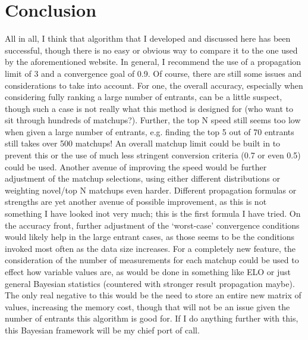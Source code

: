 \documentclass[11pt]{article}
\begin{document}
\section{Conclusion}
\noindent All in all, I think that algorithm that I developed and discussed here has been successful, though there is no easy or obvious way to compare it to the one used by the aforementioned website. In general, I recommend the use of a propagation limit of 3 and a convergence goal of 0.9. Of course, there are still some issues and considerations to take into account. For one, the overall accuracy, especially when considering fully ranking a large number of entrants, can be a little suspect, though such a case is not really what this method is designed for (who want to sit through hundreds of matchups?). Further, the top N speed still seems too low when given a large number of entrants, e.g. finding the top 5 out of 70 entrants still takes over 500 matchups! An overall matchup limit could be built in to prevent this or the use of much less stringent conversion criteria (0.7 or even 0.5) could be used. Another avenue of improving the speed would be further adjustment of the matchup selections, using either different distributions or weighting novel/top N matchups even harder. Different propagation formulas or strengths are yet another avenue of possible improvement, as this is not something I have looked inot very much; this is the first formula I have tried. On the accuracy front, further adjustment of the `worst-case' convergence conditions would likely help in the large entrant cases, as those seems to be the conditions invoked most often as the data size increases. For a completely new feature, the consideration of the number of measurements for each matchup could be used to effect how variable values are, as would be done in something like ELO or just general Bayesian statistics (countered with stronger result propagation maybe). The only real negative to this would be the need to store an entire new matrix of values, increasing the memory cost, though that will not be an issue given the number of entrants this algorithm is good for. If I do anything further with this, this Bayesian framework will be my chief port of call. 
\end{document}
